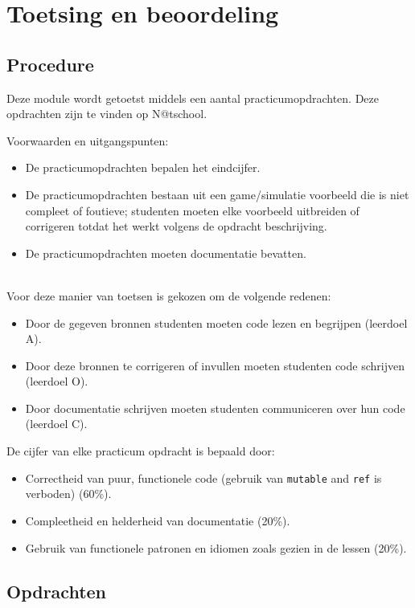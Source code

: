 \section{Toetsing en beoordeling}
	\subsection{Procedure}
		Deze module wordt getoetst middels een aantal practicumopdrachten. Deze opdrachten zijn te vinden op N@tschool.

		Voorwaarden en uitgangspunten:
		\begin{itemize}
			\item De practicumopdrachten bepalen het eindcijfer.
			\item De practicumopdrachten bestaan uit een game/simulatie voorbeeld die is niet compleet of foutieve; studenten moeten elke voorbeeld uitbreiden of corrigeren totdat het werkt volgens de opdracht beschrijving.
			\item De practicumopdrachten moeten documentatie bevatten.
		\end{itemize}
		\ \\
		
		Voor deze manier van toetsen is gekozen om de volgende redenen:
		\begin{itemize}
			\item Door de gegeven bronnen studenten moeten code lezen en begrijpen (leerdoel A).
			\item Door deze bronnen te corrigeren of invullen moeten studenten code schrijven (leerdoel O).
			\item Door documentatie schrijven moeten studenten communiceren over hun code (leerdoel C).
		\end{itemize}

		De cijfer van elke practicum opdracht is bepaald door:
		\begin{itemize}
			\item Correctheid van puur, functionele code (gebruik van \texttt{mutable} and \texttt{ref} is verboden) (60\%).
			\item Compleetheid en helderheid van documentatie (20\%).
			\item Gebruik van functionele patronen en idiomen zoals gezien in de lessen (20\%).
		\end{itemize}

	\subsection{Opdrachten}
	
